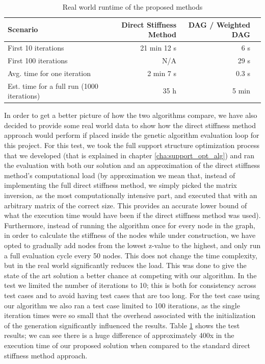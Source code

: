 \begin{table}[htbp]
  \centering
  \caption{Real world runtime of the proposed methods}
  \label{tab:stiff_real_world_runtimes_cmp}
  \begin{tabular}{lrrr}
    \toprule
    Scenario & Direct Stiffness Method & DAG / Weighted DAG \\
    \midrule
    First 10 iterations                              & 21 min 12 s & 6 s   \\
    First 100 iterations                             & N/A  & 29 s \\
    Avg. time for one iteration                      & 2 min 7 s  & 0.3 s \\
    Est. time for a full run (1000 iterations)       & 35 h  & 5 min \\
    \bottomrule
  \end{tabular}
\end{table}




In order to get a better picture of how the two algorithms compare, we have 
also decided to provide some real world data to show how the direct stiffness method
approach would perform if placed inside the genetic algorithm evaluation loop for this project.
For this test, we took the full support structure optimization process that we developed (that is explained
in chapter \ref{cha:support_opt_alg}) and ran the evaluation with both our solution and an
approximation of the direct stiffness method's computational load (by approximation we mean that,
instead of implementing the full direct stiffness method, we simply picked the matrix inversion, as
the most computationally intensive part, and executed that with an arbitrary matrix of the correct size.
This provides an accurate lower bound of what the execution time would have been if the direct stiffness
method was used). Furthermore, instead of running the algorithm once for every node in the graph, in order
to calculate the stiffness of the nodes while under construction, we have opted to gradually add nodes
from the lowest z-value to the highest, and only run a full evaluation cycle every 50 nodes.
This does not change the time complexity, but in the real world significantly reduces the load. This
was done to give the state of the art solution a better chance at competing with our algorithm.
In the test we limited the number of iterations to 10; this is both for consistency across test cases
and to avoid having test cases that are too long. For the test case using our algorithm we also ran
a test case limited to 100 iterations, as the single iteration times were so small that the overhead
associated with the initialization of the generation significantly influenced the results.
Table \ref{tab:stiff_real_world_runtimes_cmp} shows the test results; we can see there is a
huge difference of approximately 400x in the execution time of our proposed solution when compared to 
the standard direct stiffness method approach.

